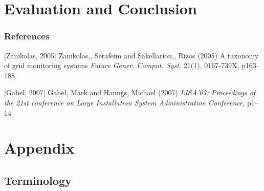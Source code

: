 \documentclass{beamer}
\renewcommand\appendixname{Appendix}
\begin{document}
\section{Evaluation and Conclusion}




\begin{frame}
\frametitle{References}
\footnotesize{
\begin{thebibliography}{99} %

[Zanikolas, 2005] {Zanikolas,, Serafeim and Sakellariou,, Rizos} (2005)
\newblock A taxonomy of grid monitoring systems
\newblock \emph{Future Gener. Comput. Syst.} 21(1), 0167-739X, p163--188.

[Gabel, 2007] {Gabel, Mark and Haungs, Michael} (2007)
\newblock \emph{LISA'07: Proceedings of the 21st conference on Large Installation System Administration Conference}, p1--14

\end{thebibliography}
}
\end{frame}


\appendix

\section{\appendixname}
\frame{\tableofcontents}

\subsection{Terminology}
\end{document}
